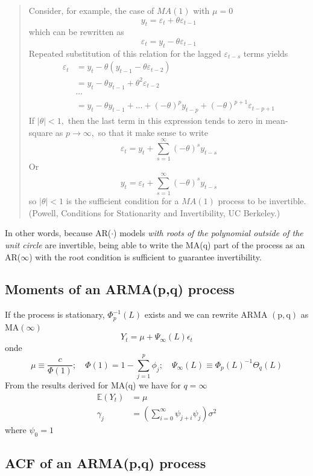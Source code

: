 \documentclass[11pt, a4paper]{report}
\theoremstyle{plain}
\theoremstyle{plain}
\theoremstyle{remark}
\begin{document}
\begin{quote}
Consider, for example, the case of $M A(1)$ with $\mu=0$
$$
y_{t}=\varepsilon_{t}+\theta \varepsilon_{t-1}
$$
which can be rewritten as
$$
\varepsilon_{t}=y_{t}-\theta \varepsilon_{t-1}
$$
Repeated substitution of this relation for the lagged $\varepsilon_{t-s}$ terms yields
$$
\begin{aligned}
	\varepsilon_{t} &=y_{t}-\theta\left(y_{t-1}-\theta \varepsilon_{t-2}\right) \\
	&=y_{t}-\theta y_{t-1}+\theta^{2} \varepsilon_{t-2} \\
	& \cdots \\
	&=y_{t}-\theta y_{t-1}+\ldots+(-\theta)^{p} y_{t-p}+(-\theta)^{p+1} \varepsilon_{t-p+1}
\end{aligned}
$$
If $|\theta|<1,$ then the last term in this expression tends to zero in mean-square as $p \rightarrow \infty,$ so that it make
sense to write
$$
\varepsilon_{t}=y_{t}+\sum_{s=1}^{\infty}(-\theta)^{s} y_{t-s}
$$
Or
$$
y_{t}=\varepsilon_{t}+\sum_{s=1}^{\infty}(-\theta)^{s} y_{t-s}
$$
so $|\theta|<1$ is the sufficient condition for a $M A(1)$ process to be invertible. (Powell, Conditions for Stationarity and Invertibility, UC Berkeley.)
\end{quote}

In other words, because AR($\cdot$) models \textit{with roots of the polynomial outside of the unit circle} are invertible, being able to write the MA(q) part of the process as an AR($\infty$) with the root condition is sufficient to guarantee invertibility.

\subsection{Moments of an ARMA(p,q) process}

If the process is stationary, $\Phi_{p}^{-1}(L)$ exists and we can rewrite ARMA $(\mathrm{p}, \mathrm{q})$ as $\mathrm{MA}(\infty)$
$$
Y_{t}=\mu+\Psi_{\infty}(L) \epsilon_{t}
$$
onde
$$
\mu \equiv \frac{c}{\Phi(1)} ; \quad \Phi(1)=1-\sum_{j=1}^{p} \phi_{j} ; \quad \Psi_{\infty}(L) \equiv \Phi_{p}(L)^{-1} \Theta_{q}(L)
$$
From the results derived for MA(q) we have for $q=\infty$
$$
\begin{aligned}
	\mathbb{E}\left(Y_{t}\right) &=\mu \\
	\gamma_{j} &=\left(\sum_{i=0}^{\infty} \psi_{j+i} \psi_{j}\right) \sigma^{2}
\end{aligned}
$$
where $\psi_{0}=1$

\subsection{ACF of an ARMA(p,q) process}
\end{document}
